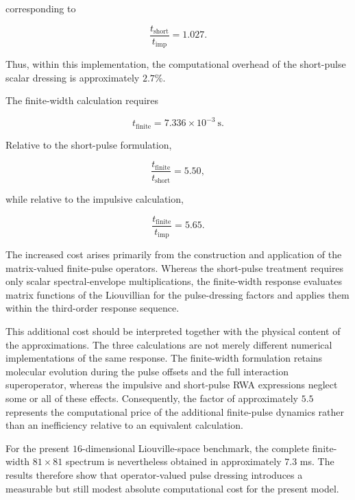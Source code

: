 \documentclass[11pt]{article}
\begin{document}
corresponding to

\begin{equation}
\frac{
t_{\mathrm{short}}
}{
t_{\mathrm{imp}}
}
=
1.027.
\end{equation}

Thus, within this implementation, the computational overhead of the
short-pulse scalar dressing is approximately $2.7\%$.

The finite-width calculation requires

\begin{equation}
\boxed{
t_{\mathrm{finite}}
=
7.336\times10^{-3}\ \mathrm{s}.
}
\end{equation}

Relative to the short-pulse formulation,

\begin{equation}
\boxed{
\frac{
t_{\mathrm{finite}}
}{
t_{\mathrm{short}}
}
=
5.50,
}
\end{equation}

while relative to the impulsive calculation,

\begin{equation}
\boxed{
\frac{
t_{\mathrm{finite}}
}{
t_{\mathrm{imp}}
}
=
5.65.
}
\end{equation}

The increased cost arises primarily from the construction and
application of the matrix-valued finite-pulse operators.  Whereas the
short-pulse treatment requires only scalar spectral-envelope
multiplications, the finite-width response evaluates matrix functions
of the Liouvillian for the pulse-dressing factors and applies them
within the third-order response sequence.

This additional cost should be interpreted together with the physical
content of the approximations.  The three calculations are not merely
different numerical implementations of the same response.  The
finite-width formulation retains molecular evolution during the pulse
offsets and the full interaction superoperator, whereas the impulsive
and short-pulse RWA expressions neglect some or all of these effects.
Consequently, the factor of approximately $5.5$ represents the
computational price of the additional finite-pulse dynamics rather
than an inefficiency relative to an equivalent calculation.

For the present $16$-dimensional Liouville-space benchmark, the
complete finite-width $81\times81$ spectrum is nevertheless obtained
in approximately $7.3$ ms.  The results therefore show that
operator-valued pulse dressing introduces a measurable but still
modest absolute computational cost for the present model.
\end{document}
